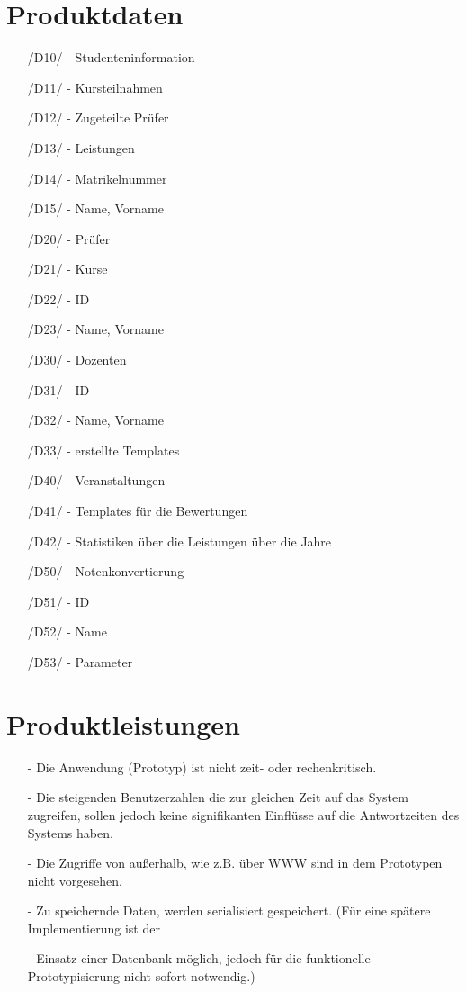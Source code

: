 	
	\section{Produktdaten}
	\begin{itemize}
	\item[/D10/] - Studenteninformation
		\item[/D11/] - Kursteilnahmen
		\item[/D12/] - Zugeteilte Prüfer
		\item[/D13/] - Leistungen
		\item[/D14/] - Matrikelnummer
		\item[/D15/]  - Name, Vorname
	\item[/D20/] - Prüfer
		\item[/D21/] -  Kurse
		\item[/D22/] - ID
		\item[/D23/] - Name, Vorname
	\item[/D30/] - Dozenten
		\item[/D31/] - ID
		\item[/D32/] - Name, Vorname
		\item[/D33/] - erstellte Templates
	\item[/D40/] - Veranstaltungen
		\item[/D41/] - Templates für die Bewertungen
		\item[/D42/] - Statistiken über die Leistungen über die Jahre
	\item[/D50/] - Notenkonvertierung
		\item[/D51/] - ID
		\item[/D52/] - Name
		\item[/D53/] - Parameter
	\end{itemize}
	
	\section{Produktleistungen}
	\begin{itemize}
	\item[-]	Die Anwendung (Prototyp) ist nicht zeit- oder  rechenkritisch.
	\item[-]	Die steigenden Benutzerzahlen die zur gleichen Zeit auf das System zugreifen, sollen jedoch keine signifikanten Einflüsse auf die Antwortzeiten des Systems haben. 
	\item[-]	Die Zugriffe von außerhalb, wie z.B. über WWW sind in dem Prototypen nicht vorgesehen.
	\item[-]	Zu speichernde Daten, werden serialisiert gespeichert. (Für eine spätere Implementierung ist der \item[-]	Einsatz einer Datenbank möglich, jedoch für die funktionelle Prototypisierung nicht sofort notwendig.)
	\end{itemize}

